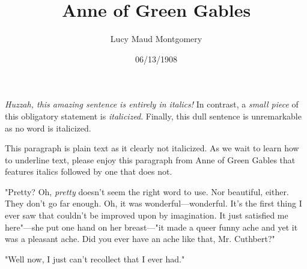\documentclass[a4paper]{article}
\title{Anne of Green Gables}
\author{Lucy Maud Montgomery}
\date{06/13/1908}
\begin{document}
\maketitle

\textit{Huzzah, this amazing sentence is entirely in italics!} In contrast, a \textit{small piece} of this obligatory statement is \textit{italicized}. Finally, this dull sentence is unremarkable as no word is italicized.

This paragraph is plain text as it clearly not italicized. As we wait to learn how to underline text, please enjoy this paragraph from Anne of Green Gables that features italics followed by one that does not.

"Pretty? Oh, \textit{pretty} doesn't seem the right word to use. Nor beautiful, either. They don't go far enough. Oh, it was wonderful---wonderful. It's the first thing I ever saw that couldn't be improved upon by imagination. It just satisfied me here"---she put one hand on her breast---"it made a queer funny ache and yet it was a pleasant ache. Did you ever have an ache like that, Mr. Cuthbert?"

"Well now, I just can't recollect that I ever had."
\end{document}
